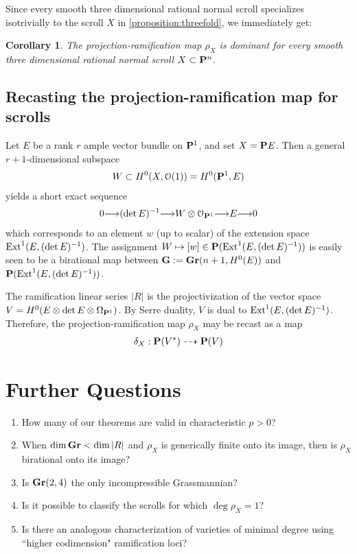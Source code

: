 \documentclass[11pt,reqno]{amsart}
\theoremstyle{plain}
\newtheorem{corollary}[theorem]{Corollary}
\theoremstyle{definition}
\theoremstyle{remark}
\numberwithin{equation}{section}
\DeclareMathOperator{\dm}{dim}
\renewcommand{\to}{{\longrightarrow}}
\numberwithin{equation}{section}
\renewcommand{\O}{\mathcal O}
\newcommand{\G}{\mathbf G}
\begin{document}
Since every smooth three dimensional rational normal scroll specializes isotrivially to the scroll $X$ in \autoref{proposition:threefold}, we immediately get: 

\begin{corollary}\label{corollary:maxVariation3Scrolls}
	The projection-ramification map $\rho_{X}$ is dominant for every smooth three dimensional rational normal scroll $X \subset \P^{n}$.
\end{corollary}

\subsection{Recasting the projection-ramification map for scrolls} Let $E$ be a rank $r$ ample vector bundle on $\P^{1}$, and set $X = \P E$.  Then a general $r+1$-dimensional subspace 
\begin{align*}
    W \subset H^{0}(X, \O(1)) = H^{0}(\P^{1},E)
\end{align*}
yields a short exact sequence 
\begin{align*}
    0 \to (\det E)^{-1} \to W \otimes \O_{\P^{1}} \to E \to 0
\end{align*}
which corresponds to an element $w$ (up to scalar) of the extension space $\Ext^{1}(E,(\det E)^{-1})$. The assignment $W \mapsto [w] \in \P(\Ext^{1}(E,(\det E)^{-1}))$ is easily seen to be a birational map between $\G := \Gr(n+1,H^{0}(E))$ and $\P(\Ext^{1}(E,(\det E)^{-1}))$.

The ramification linear series $|R|$ is the projectivization of the vector space $V = H^{0}(E \otimes \det E \otimes \Omega_{\P^{1}})$.  By Serre duality, $V$ is dual to $\Ext^{1}(E,(\det E)^{-1})$.  Therefore, the projection-ramification map $\rho_{X}$ may be recast as a map
\begin{align*}
    \delta_{X}: \P(V^{*}) \dashrightarrow \P(V)
\end{align*}



\section{Further Questions}

\begin{enumerate}
    \item How many of our theorems are valid in characteristic $p > 0$?  
    \item When $\dm \Gr < \dm |R|$ and $\rho_{X}$ is generically finite onto its image, then is $\rho_X$ birational onto its image?
    \item Is $\Gr(2,4)$ the only incompressible Grassmannian?
    \item Is it possible to classify the scrolls for which $\deg \rho_{X} = 1$?
    \item Is there an analogous characterization of varieties of minimal degree using ``higher codimension" ramification loci?
\end{enumerate}









 
   
\end{document}
